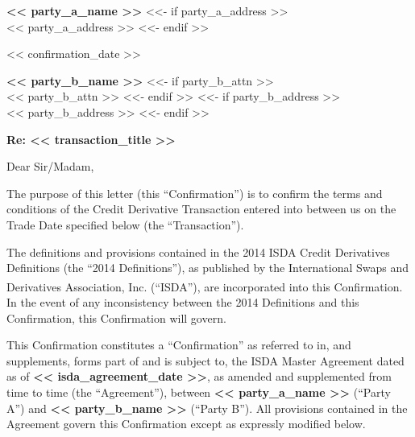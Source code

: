 \documentclass[11pt, a4paper]{article}
\begin{document}

\begin{center}
    \textbf{<< party_a_name >>}
    <<- if party_a_address >>
    \\ << party_a_address >>
    <<- endif >>
\end{center}
\vspace{0.3cm}

\begin{flushright}
    << confirmation_date >>
\end{flushright}

\vspace{0.3cm}
\noindent \textbf{<< party_b_name >>}
<<- if party_b_attn >>
\\ << party_b_attn >>
<<- endif >>
<<- if party_b_address >>
\\ << party_b_address >>
<<- endif >>

\vspace{0.5cm}
\noindent \textbf{Re: << transaction_title >>}

\vspace{0.3cm}
\noindent Dear Sir/Madam,

\vspace{0.3cm}
\noindent The purpose of this letter (this ``Confirmation'') is to confirm the terms and conditions of the Credit Derivative Transaction entered into between us on the Trade Date specified below (the ``Transaction'').

\vspace{0.3cm}
\noindent The definitions and provisions contained in the 2014 ISDA Credit Derivatives Definitions (the ``2014 Definitions''), as published by the International Swaps and Derivatives Association, Inc. (``ISDA\textsuperscript{\textregistered}''), are incorporated into this Confirmation. In the event of any inconsistency between the 2014 Definitions and this Confirmation, this Confirmation will govern.

\vspace{0.3cm}
\noindent This Confirmation constitutes a ``Confirmation'' as referred to in, and supplements, forms part of and is subject to, the ISDA Master Agreement dated as of \textbf{<< isda_agreement_date >>}, as amended and supplemented from time to time (the ``Agreement''), between \textbf{<< party_a_name >>} (``Party A'') and \textbf{<< party_b_name >>} (``Party B''). All provisions contained in the Agreement govern this Confirmation except as expressly modified below.
\end{document}
